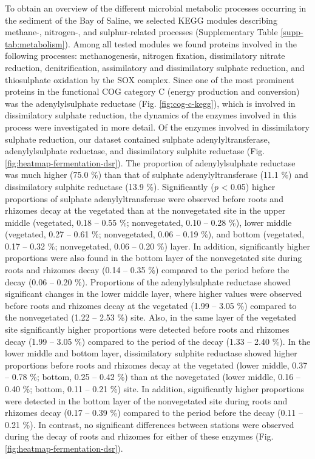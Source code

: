 \documentclass[
  12 pt,
]{article}
\begin{document}
To obtain an overview of the different microbial metabolic processes occurring in the sediment of the Bay of Saline, we selected KEGG modules describing methane-, nitrogen-, and sulphur-related processes (Supplementary Table \ref{supp-tab:metabolism}). Among all tested modules we found proteins involved in the following processes: methanogenesis, nitrogen fixation, dissimilatory nitrate reduction, denitrification, assimilatory and dissimilatory sulphate reduction, and thiosulphate oxidation by the SOX complex. Since one of the most prominent proteins in the functional COG category C (energy production and conversion) was the adenylylsulphate reductase (Fig. \ref{fig:cog-c-kegg}), which is involved in dissimilatory sulphate reduction, the dynamics of the enzymes involved in this process were investigated in more detail. Of the enzymes involved in dissimilatory sulphate reduction, our dataset contained sulphate adenylyltransferase, adenylylsulphate reductase, and dissimilatory sulphite reductase (Fig. \ref{fig:heatmap-fermentation-dsr}). The proportion of adenylylsulphate reductase was much higher (75.0 \si{\percent}) than that of sulphate adenylyltransferase (11.1 \si{\percent}) and dissimilatory sulphite reductase (13.9 \si{\percent}). Significantly (\emph{p} \textless{} 0.05) higher proportions of sulphate adenylyltransferase were observed before roots and rhizomes decay at the vegetated than at the nonvegetated site in the upper middle (vegetated, 0.18 -- 0.55 \si{\percent}; nonvegetated, 0.10 -- 0.28 \si{\percent}), lower middle (vegetated, 0.27 -- 0.61 \si{\percent}; nonvegetated, 0.06 -- 0.19 \si{\percent}), and bottom (vegetated, 0.17 -- 0.32 \si{\percent}; nonvegetated, 0.06 -- 0.20 \si{\percent}) layer. In addition, significantly higher proportions were also found in the bottom layer of the nonvegetated site during roots and rhizomes decay (0.14 -- 0.35 \si{\percent}) compared to the period before the decay (0.06 -- 0.20 \si{\percent}). Proportions of the adenylylsulphate reductase showed significant changes in the lower middle layer, where higher values were observed before roots and rhizomes decay at the vegetated (1.99 -- 3.05 \si{\percent}) compared to the nonvegetated (1.22 -- 2.53 \si{\percent}) site. Also, in the same layer of the vegetated site significantly higher proportions were detected before roots and rhizomes decay (1.99 -- 3.05 \si{\percent}) compared to the period of the decay (1.33 -- 2.40 \si{\percent}). In the lower middle and bottom layer, dissimilatory sulphite reductase showed higher proportions before roots and rhizomes decay at the vegetated (lower middle, 0.37 -- 0.78 \si{\percent}; bottom, 0.25 -- 0.42 \si{\percent}) than at the novegetated (lower middle, 0.16 -- 0.40 \si{\percent}; bottom, 0.11 -- 0.21 \si{\percent}) site. In addition, significantly higher proportions were detected in the bottom layer of the nonvegetated site during roots and rhizomes decay (0.17 -- 0.39 \si{\percent}) compared to the period before the decay (0.11 -- 0.21 \si{\percent}). In contrast, no significant differences between stations were observed during the decay of roots and rhizomes for either of these enzymes (Fig. \ref{fig:heatmap-fermentation-dsr}).
\end{document}
